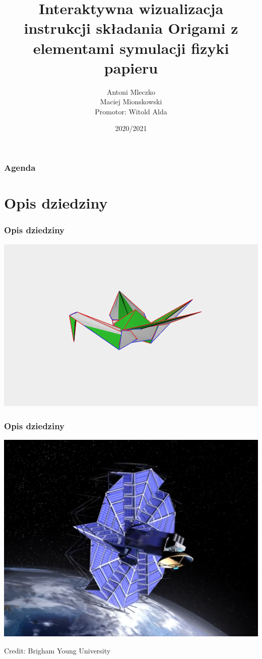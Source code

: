 \documentclass{beamer}
\author[Antoni M. \\ Maciej M.]{
	Antoni Mleczko \\
	Maciej Mionskowski \\
	Promotor: Witold Alda
}
\title[Origami]{Interaktywna wizualizacja instrukcji składania Origami z elementami symulacji fizyki papieru}
\institute{Wydział Informatyki, Elektroniki i Telekomunikacji}
\date{2020/2021}
\begin{document}
\begin{frame}
  \titlepage
\end{frame}

\begin{frame}
  \frametitle{Agenda}
  \tableofcontents
\end{frame}

\section{Opis dziedziny}
\begin{frame}
  \frametitle{Opis dziedziny}
  \includegraphics[width=\linewidth]{assets/pres-crane.png}
\end{frame}
\begin{frame}
  \frametitle{Opis dziedziny}
  \centering
	\includegraphics[width=0.9\linewidth]{assets/solar-deployment.png} \\
	\begin{flushright}
		\tiny{Credit: Brigham Young University}
	\end{flushright}
\end{frame}
\end{document}
